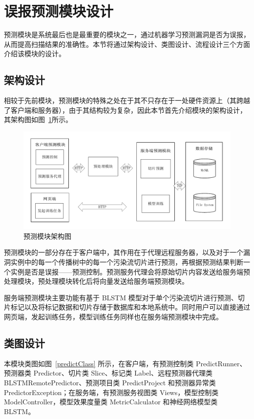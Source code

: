 \section{误报预测模块设计}

预测模块是系统最后也是最重要的模块之一，通过机器学习预测漏洞是否为误报，从而提高扫描结果的准确性。本节将通过架构设计、类图设计、流程设计三个方面介绍该模块的设计。

\subsection{架构设计}

相较于先前模块，预测模块的特殊之处在于其不只存在于一处硬件资源上（其跨越了客户端和服务器），由于其结构较为复杂，因此本节首先介绍模块的架构设计，其架构图如图~\ref{predictArch}所示。

\begin{figure}[!htbp]
    \centering
    \includegraphics[width=0.8\linewidth]{FIGs/chapter3/predict-architecture.pdf}
    \caption{预测模块架构图}\label{predictArch}
\end{figure}

预测模块的一部分存在于客户端中，其作用在于代理远程服务器，以及对于一个漏洞实例中的每一个传播树中的每一个污染流切片进行预测，再根据预测结果判断一个实例是否是误报——预测控制。预测服务代理会将原始切片内容发送给服务端预处理模块，预处理模块转化后将向量发送给服务端预测模块。

服务端预测模块主要功能有基于 BLSTM 模型对于单个污染流切片进行预测、切片标记以及将标记数据和切片存储于数据库和本地系统中。同时用户可以直接通过网页端，发起训练任务，模型训练任务同样也在服务端预测模块中完成。

\subsection{类图设计}

本模块类图如图~\ref{predictClass} 所示，在客户端，有预测控制类 PredictRunner、预测器类 Predictor、切片类 Slice、标记类 Label、远程预测器代理类 BLSTMRemotePredictor、预测项目类 PredictProject 和预测器异常类 PredictorException；在服务端，有预测服务视图类 Views，模型控制类 ModelController，模型效果度量类 MetricCalculator 和神经网络模型类 BLSTM。

